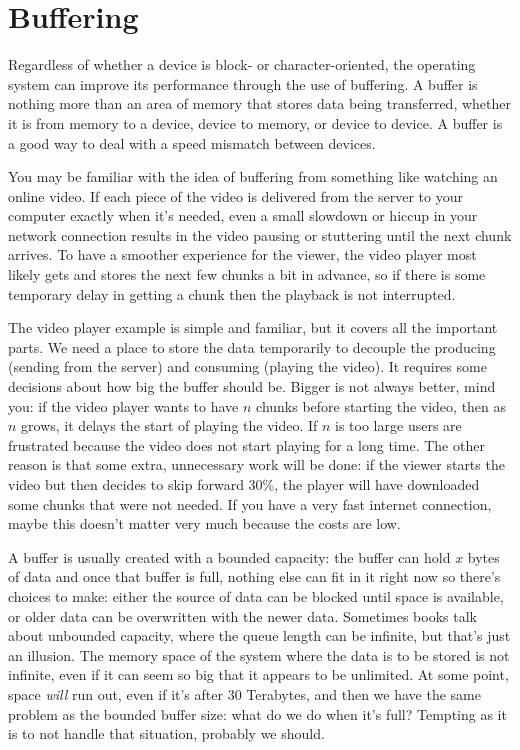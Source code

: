 




\section*{Buffering}

Regardless of whether a device is block- or character-oriented, the operating system can improve its performance through the use of buffering. A buffer is nothing more than an area of memory that stores data being transferred, whether it is from memory to a device, device to memory, or device to device.  A buffer is a good way to deal with a speed mismatch between devices.

You may be familiar with the idea of buffering from something like watching an online video. If each piece of the video is delivered from the server to your computer exactly when it's needed, even a small slowdown or hiccup in your network connection results in the video pausing or stuttering until the next chunk arrives. To have a smoother experience for the viewer, the video player most likely gets and stores the next few chunks a bit in advance, so if there is some temporary delay in getting a chunk then the playback is not interrupted.

The video player example is simple and familiar, but it covers all the important parts. We need a place to store the data temporarily to decouple the producing (sending from the server) and consuming (playing the video). It requires some decisions about how big the buffer should be. Bigger is not always better, mind you: if the video player wants to have $n$ chunks before starting the video, then as $n$ grows, it delays the start of playing the video. If $n$ is too large users are frustrated because the video does not start playing for a long time. The other reason is that some extra, unnecessary work will be done: if the viewer starts the video but then decides to skip forward 30\%, the player will have downloaded some chunks that were not needed. If you have a very fast internet connection, maybe this doesn't matter very much because the costs are low.

A buffer is usually created with a bounded capacity: the buffer can hold $x$ bytes of data and once that buffer is full, nothing else can fit in it right now so there's choices to make: either the source of data can be blocked until space is available, or older data can be overwritten with the newer data. Sometimes books talk about unbounded capacity, where the queue length can be infinite, but that's just an illusion. The memory space of the system where the data is to be stored is not infinite, even if it can seem so big that it appears to be unlimited. At some point, space \textit{will} run out, even if it's after 30 Terabytes, and then we have the same problem as the bounded buffer size: what do we do when it's full? Tempting as it is to not handle that situation, probably we should.

